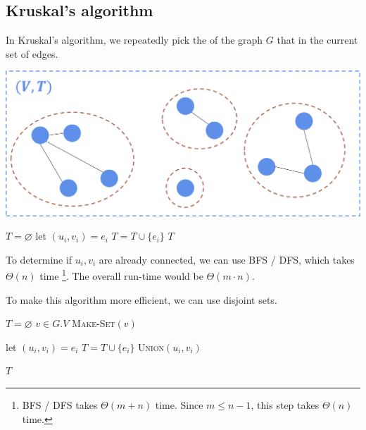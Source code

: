 \subsection{Kruskal's algorithm}

In Kruskal's algorithm, we repeatedly pick the  of the graph $G$ that  in the current set of edges.

\begin{center} \includegraphics[width=0.5\linewidth]{images/Kruskals-Algorithm.png} \end{center}

\begin{algorithm}[H] \begin{algorithmic}[1]
        \State {}
        \State $T = \varnothing$
            \State let $(u_i, v_i) = e_i$
                \State $T = T \cup \{ e_i \}$
            \EndIf
        \EndFor
        \State \Return $T$
    \EndProcedure
\end{algorithmic} \end{algorithm}

To determine if $u_i, v_i$ are already connected, we can use BFS / DFS, which takes $\Theta(n)$ time \footnote{BFS / DFS takes $\Theta(m + n)$ time. Since $m \le n - 1$, this step takes $\Theta(n)$ time.}. The overall run-time would be $\Theta(m \cdot n)$. 

To make this algorithm more efficient, we can use disjoint sets.

\begin{algorithm}[H] \begin{algorithmic}[1]
        \State {}
        \State $T = \varnothing$
        \For $v \in G.V$
            \State \textsc{Make-Set}$(v)$
        \EndFor

            \State let $(u_i, v_i) = e_i$
                \State $T = T \cup \{ e_i \}$
                \State \textsc{Union}$(u_i, v_i)$
            \EndIf
        \EndFor

        \State \Return $T$
    \EndProcedure
\end{algorithmic} \end{algorithm}

